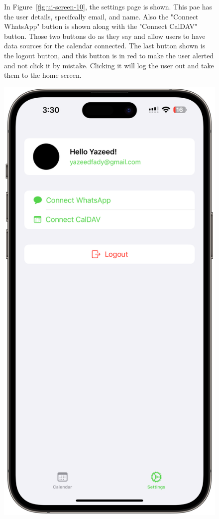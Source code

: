 \begin{figure}[!h]
    \begin{minipage}{0.65\textwidth}
        In Figure~\ref{fig:ui-screen-10}, the settings page is shown. This pae has the user details, specifcally email, and name. Also the "Connect WhatsApp" button is shown along with the "Connect CalDAV" button. Those two buttons do as they say and allow users to have data sources for the calendar connected. The last button shown is the logout button, and this button is in red to make the user alerted and not click it by mistake. Clicking it will log the user out and take them to the home screen.
    \end{minipage}
    \hfill
    \begin{minipage}{0.3\textwidth}
        \centering
        \includegraphics[width=\textwidth]{images/screen10.png}

\end{minipage}
\end{figure}
